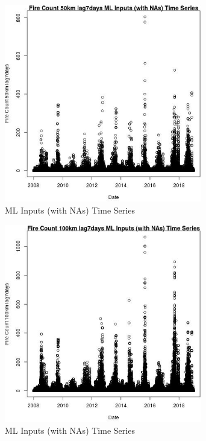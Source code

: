 \begin{figure} 
\centering  
\includegraphics[width=0.77\textwidth]{Code_Outputs/Report_ML_input_PM25_Step4_part_f_de_duplicated_aves_prioritize_24hr_obswNAs_Fire_Count_50km_lag7daysvDate.jpg} 
\caption{\label{fig:Report_ML_input_PM25_Step4_part_f_de_duplicated_aves_prioritize_24hr_obswNAsFire_Count_50km_lag7daysvDate}ML Inputs (with NAs) Time Series} 
\end{figure} 
 

\begin{figure} 
\centering  
\includegraphics[width=0.77\textwidth]{Code_Outputs/Report_ML_input_PM25_Step4_part_f_de_duplicated_aves_prioritize_24hr_obswNAs_Fire_Count_100km_lag7daysvDate.jpg} 
\caption{\label{fig:Report_ML_input_PM25_Step4_part_f_de_duplicated_aves_prioritize_24hr_obswNAsFire_Count_100km_lag7daysvDate}ML Inputs (with NAs) Time Series} 
\end{figure} 
 

